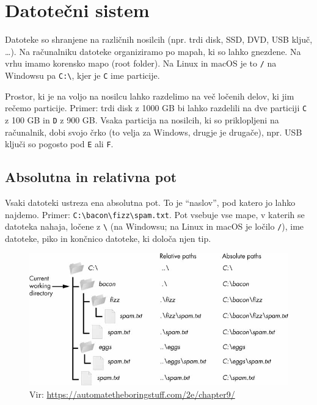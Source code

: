 \documentclass[
]{book}
\begin{document}
\hypertarget{datoteux10dni-sistem}{%
\section{Datotečni sistem}\label{datoteux10dni-sistem}}

Datoteke so shranjene na različnih nosilcih (npr. trdi disk, SSD, DVD, USB ključ, \ldots).
Na računalniku datoteke organiziramo po mapah, ki so lahko gnezdene. Na vrhu
imamo korensko mapo (root folder). Na Linux in macOS je to \texttt{/} na Windowsu pa
\texttt{C:\textbackslash{}}, kjer je \texttt{C} ime particije.

Prostor, ki je na voljo na nosilcu lahko razdelimo
na več ločenih delov, ki jim rečemo particije. Primer: trdi disk z
1000 GB bi lahko razdelili na dve particiji \texttt{C} z 100 GB in \texttt{D} z 900 GB. Vsaka
particija na nosilcih, ki so priklopljeni na računalnik, dobi svojo črko
(to velja za Windows, drugje je drugače), npr.
USB ključi so pogosto pod \texttt{E} ali \texttt{F}.

\hypertarget{absolutna-in-relativna-pot}{%
\subsection{Absolutna in relativna pot}\label{absolutna-in-relativna-pot}}

Vsaki datoteki ustreza ena absolutna pot. To je ``naslov'', pod katero jo lahko najdemo.
Primer: \texttt{C:\textbackslash{}bacon\textbackslash{}fizz\textbackslash{}spam.txt}. Pot vsebuje vse mape, v katerih se datoteka
nahaja, ločene z \texttt{\textbackslash{}} (na Windowsu; na Linux in macOS je ločilo \texttt{/}), ime datoteke,
piko in končnico datoteke, ki določa njen tip.

\begin{figure}
\centering
\includegraphics{./images/paths.jpeg}
\caption{Vir: \url{https://automatetheboringstuff.com/2e/chapter9/}}
\end{figure}
\end{document}
